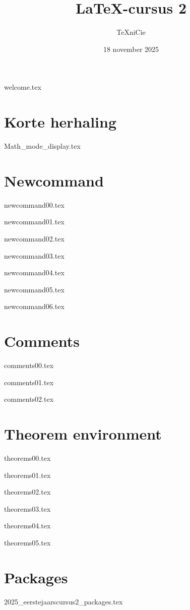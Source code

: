 \documentclass[allauthors,dutch]{../../cursuspresentatie}
\title{\LaTeX{}-cursus 2}
\author{\TeX niCie}
\date{18 november 2025}
\def\importslidei#1#2{%
	{#2}
}
\def\importslideh#1#2{%
	{#2}
}
\def\importslidej#1#2{%
	{#2}
}
\def\importslidey#1#2{%
	{#2}
}
\begin{document}
\importslideh{beginners_NL}{welcome.tex}

\section{Korte herhaling}
\def\placetarget{\hypertarget{herhaling}{}}

\importslidei{2025-eerstejaars_cursus_1}{Math_mode_display.tex}

\section{Newcommand}
\def\placetarget{\hypertarget{newcommand}{}}

\importslidey{2025-eerstejaars_cursus_2}{newcommand00.tex}
\importslidey{2025-eerstejaars_cursus_2}{newcommand01.tex}
\importslidey{2025-eerstejaars_cursus_2}{newcommand02.tex}
\importslidey{2025-eerstejaars_cursus_2}{newcommand03.tex}
\importslidey{2025-eerstejaars_cursus_2}{newcommand04.tex}
\importslidey{2025-eerstejaars_cursus_2}{newcommand05.tex}
\importslidey{2025-eerstejaars_cursus_2}{newcommand06.tex}

\section{Comments}
\def\placetarget{\hypertarget{comments}{}}

\importslidey{2025-eerstejaars_cursus_2}{comments00.tex}
\importslidey{2025-eerstejaars_cursus_2}{comments01.tex}
\importslidey{2025-eerstejaars_cursus_2}{comments02.tex}

\section{Theorem environment}
\def\placetarget{\hypertarget{theorem_environment}{}}
\importslidey{2025-eerstejaars_cursus_2}{theorems00.tex}
\importslidey{2025-eerstejaars_cursus_2}{theorems01.tex}
\importslidey{2025-eerstejaars_cursus_2}{theorems02.tex}
\importslidey{2025-eerstejaars_cursus_2}{theorems03.tex}
\importslidey{2025-eerstejaars_cursus_2}{theorems04.tex}
\importslidey{2025-eerstejaars_cursus_2}{theorems05.tex}

\section{Packages}
\def\placetarget{\hypertarget{packages}{}}
\importslidej{cursus2}{2025_eerstejaarscursus2_packages.tex}
\end{document}
